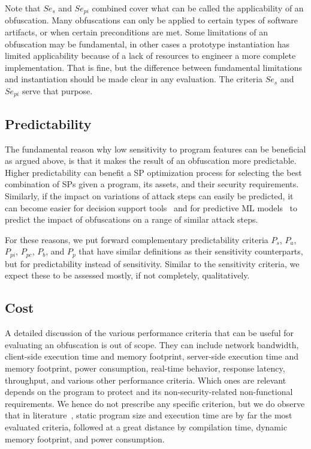 Note that $Se_s$ and $Se_{pi}$ combined cover what can be called the applicability of an obfuscation. Many obfuscations can only be applied to certain types of software artifacts, or when certain preconditions are met. Some limitations of an obfuscation may be fundamental, in other cases a prototype instantiation has limited applicability because of a lack of resources to engineer a more complete implementation. That is fine, but the difference between fundamental limitations and instantiation should be made clear in any evaluation. The criteria $Se_s$ and $Se_{pi}$ serve that purpose.  

\subsection{Predictability}
The fundamental reason why low sensitivity to program features can be beneficial as argued above, is that it makes the result of an obfuscation more predictable. Higher predictability can benefit a SP optimization process for selecting the best combination of SPs given a program, its assets, and their security requirements. Similarly, if the impact on variations of attack steps can easily be predicted, it can become easier for decision support tools~\cite{checkmate24} and for predictive ML models~\cite{reganoMetric,2017_predicting_the_resilience_of_obfuscated_code_against_symbolic_execution_attacks_via_machine_learning} to predict the impact of obfuscations on a range of similar attack steps.  

For these reasons, we put forward complementary predictability criteria $P_s$, $P_{a}$, $P_{pi}$, $P_{pc}$, $P_{b}$, and $P_{p}$ that have similar definitions as their sensitivity counterparts, but for predictability instead of sensitivity. Similar to the sensitivity criteria, we expect these to be assessed mostly, if not completely, qualitatively. 
 
\subsection{Cost}
A detailed discussion of the various performance criteria that can be useful for evaluating an obfuscation is out of scope. They can include network bandwidth, client-side execution time and memory footprint, server-side execution time and memory footprint, power consumption, real-time behavior, response latency, throughput, and various other performance criteria. Which ones are relevant depends on the program to protect and its non-security-related non-functional requirements. We hence do not prescribe any specific criterion, but we do observe that in literature~\cite{desutter2024evaluation}, static program size and execution time are by far the most evaluated criteria, followed at a great distance by compilation time, dynamic memory footprint, and power consumption. 

